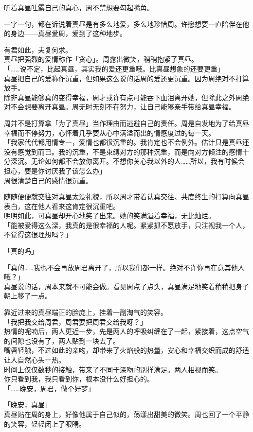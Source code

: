 听着真昼吐露自己的真心，周不禁想要勾起嘴角。

一字一句，都在诉说着真昼是有多么地爱，多么地珍惜周。许愿想要一直陪伴在他的身边——真昼爱周，爱到了这种地步。

有君如此，夫复何求。\\

真昼把强烈的爱情称作「贪心」。周露出微笑，稍稍抱紧了真昼。\\

「……说不定，比起真昼，其实我的爱还更重哦。比真昼想象的还要更重」\\

真昼把自己的爱称作沉重，但如果这么说的话周的爱还更沉重。因为周绝对不打算放手。\\

除非真昼能够真的变得幸福，周才或许有点可能吞下血泪离开她，但除此之外周绝对不会想要离开真昼。周无时无刻不在努力，让自己能够亲手带给真昼幸福。

周并不是打算拿「为了真昼」当作理由而逃避自己的责任。周是自发地为了给真昼幸福而不停努力，心怀着几乎要从心中满溢而出的情感度过的每一天。\\

「我家代代都用情专一，爱情也都很沉重的。我肯定也不会例外。估计只是真昼还没有感觉到而已。我的沉重，不是束缚对方的那种沉重，而是向对方倾注的感情十分深沉。无论如何都不会放你离开。不想你关心我以外的人……所以，我有时候会担心，要是你讨厌我了该怎么办」\\

周很清楚自己的感情很沉重。

随随便便就交往对真昼太没礼貌，所以周才带着认真交往、共度终生的打算向真昼表白，这在他人看来这肯定很沉重吧。\\

明明如此，可真昼却开心地笑了出来。她的笑满溢着幸福，无比灿烂。\\

「能被爱得这么深，我真的是很幸福的人呢。紧紧抓不愿放手，只注视我一个人，不觉得这很理想吗？」

「真的吗」

「真的……我也不会再放周君离开了，所以我们都一样。绝对不许你再在意其他人哦？」\\

真昼说的话，周本来就不可能会做。看见周点了点头，真昼满足地笑着稍稍把身子朝上移了一点。

靠近过来的真昼端正的脸庞上，挂着一副淘气的笑容。\\

「我把我交给周君，周君要把周君交给我呀？」\\

热情的呢喃后，两人更近一步，先是两人的呼吸纠缠在了一起，紧接着，这点空气的间隙也没有了，两人贴到一块去了。\\

嘴唇轻触，不过如此的亲吻，却带来了火焰般的热量，安心和幸福交织而成的舒适让人自然心头一热。\\

时间上仅仅数秒的接触，带来了不同于深吻的别样满足。两人相视而笑。\\

你只看到我，我只看到你，根本没什么好担心的。\\

「……晚安，周君，做个好梦」

「晚安，真昼」\\

真昼贴在周的身上，好像他属于自己似的，荡漾出甜美的微笑。周也回了一个平静的笑容，轻轻闭上了眼睛。
